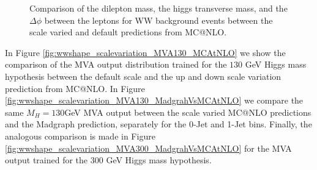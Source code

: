 \begin{figure}[!htbp]
\begin{center}
\caption{Comparison of the dilepton mass, the higgs transverse mass, and the $\Delta\phi$ between the 
leptons for WW background events between the scale varied and default predictions from MC@NLO.
}
\label{fig:wwshape_scalevariation_mass}
\end{center}
\end{figure}


In Figure \ref{fig:wwshape_scalevariation_MVA130_MCAtNLO} we show the comparison
of the MVA output distribution trained for the $130$ GeV Higgs mass hypothesis
between the default scale and the up and down scale variation prediction from 
MC@NLO. In Figure \ref{fig:wwshape_scalevariation_MVA130_MadgrahVsMCAtNLO} we
compare the same $M_{H} = 130$GeV MVA output between the scale varied 
MC@NLO predictions and the Madgraph prediction, separately for the 0-Jet
and 1-Jet bins. Finally, the analogous comparison is made in Figure 
\ref{fig:wwshape_scalevariation_MVA300_MadgrahVsMCAtNLO} for the MVA
output trained for the $300$ GeV Higgs mass hypothesis. 



